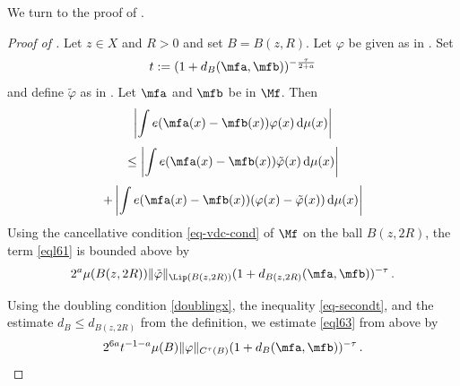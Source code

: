 We turn to the proof of .
\begin{proof}[Proof of ]
    \leanok
Let $z\in X$ and $R>0$ and set $B=B(z,R)$. Let $\varphi$
be given as in .
Set
\begin{equation}\label{eql69}
    t:=(1+d_B(\mfa,\mfb))^{-\frac{\tau}{2+a}}
\end{equation}
and define $\tilde{\varphi}$ as in . Let $\mfa$ and $\mfb$ be in $\Mf$.
Then
   \begin{equation}\label{eql60}
       \left|\int e(\mfa(x)-{\mfb(x)}) \varphi (x)\, \mathrm{d}\mu(x)\right|
   \end{equation}
    \begin{equation}\label{eql61}
   \le \left|\int e(\mfa(x)-{\mfb(x)}) \tilde{\varphi} (x)\, \mathrm{d}\mu(x)\right|
   \end{equation}
         \begin{equation}\label{eql62}
     + \left|\int e(\mfa(x)-{\mfb(x)}) (\varphi (x)-\tilde{\varphi}(x))\, \mathrm{d}\mu(x)\right|
   \end{equation}
Using the cancellative condition \eqref{eq-vdc-cond} of $\Mf$ on the ball $B(z,2R)$, the term \eqref{eql61} is bounded above by
 \begin{equation}\label{eql63}
       2^a \mu(B(z,2R)) \|\tilde{\varphi}\|_{\Lip(B(z,2R))} (1 + d_{B(z,2R)}(\mfa,\mfb))^{-\tau} \, .
 \end{equation}



Using the doubling condition \eqref{doublingx},
the inequality \eqref{eq-secondt}, and the estimate
$d_B\le d_{B(z,2R)}$ from the definition,
we estimate \eqref{eql63} from above by
\begin{equation}\label{eql64}
       2^{6a}t^{-1-a} \mu(B) \|{\varphi}\|_{C^\tau(B)}
       (1 + d_{B}(\mfa,\mfb))^{-\tau} \, .
 \end{equation}


\end{proof}
